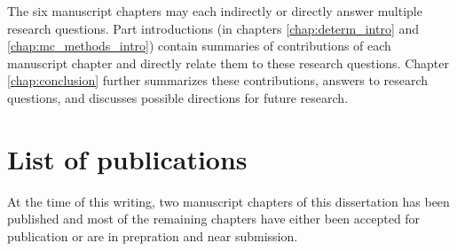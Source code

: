 The six manuscript chapters may each indirectly or directly answer multiple research questions.
Part introductions (in chapters \ref{chap:determ_intro} and \ref{chap:mc_methods_intro}) contain summaries of contributions of each manuscript chapter and directly relate them to these research questions.
Chapter \ref{chap:conclusion} further summarizes these contributions, answers to research questions, and discusses possible directions for future research.

\section{List of publications}

At the time of this writing, two manuscript chapters of this dissertation has been published and most of the remaining chapters have either been accepted for publication or are in prepration and near submission.
